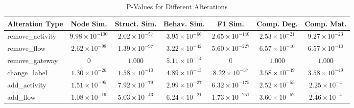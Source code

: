 \begin{table}
\caption{P-Values for Different Alterations}
\label{tab:pvalues}
\begin{tabular}{lcccccc}
\toprule
Alteration Type & Node Sim. & Struct. Sim. & Behav. Sim. & F1 Sim. & Comp. Deg. & Comp. Mat. \\
\midrule
remove_activity & $9.98 \times 10^{-100}$ & $2.02 \times 10^{-57}$ & $3.95 \times 10^{-66}$ & $2.65 \times 10^{-140}$ & $2.53 \times 10^{-21}$ & $9.27 \times 10^{-23}$ \\
remove_flow & $2.62 \times 10^{-98}$ & $1.39 \times 10^{-97}$ & $3.22 \times 10^{-42}$ & $5.60 \times 10^{-227}$ & $6.57 \times 10^{-10}$ & $6.57 \times 10^{-10}$ \\
remove_gateway & $0$ & $1.000$ & $5.11 \times 10^{-14}$ & $0$ & $1.000$ & $1.000$ \\
change_label & $1.30 \times 10^{-26}$ & $1.58 \times 10^{-10}$ & $4.89 \times 10^{-13}$ & $8.22 \times 10^{-37}$ & $3.58 \times 10^{-49}$ & $3.58 \times 10^{-49}$ \\
add_activity & $1.51 \times 10^{-95}$ & $7.92 \times 10^{-79}$ & $2.99 \times 10^{-27}$ & $6.32 \times 10^{-175}$ & $2.52 \times 10^{-55}$ & $2.25 \times 10^{-4}$ \\
add_flow & $1.08 \times 10^{-19}$ & $5.03 \times 10^{-43}$ & $6.24 \times 10^{-21}$ & $1.73 \times 10^{-251}$ & $3.60 \times 10^{-52}$ & $2.46 \times 10^{-4}$ \\
\bottomrule
\end{tabular}
\end{table}
